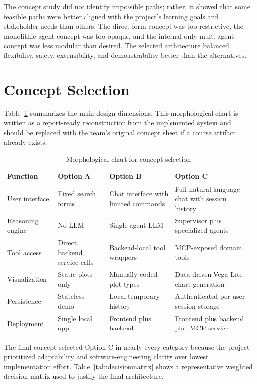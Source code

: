 \documentclass[12pt,oneside]{report}
\begin{document}
The concept study did not identify impossible paths; rather, it showed that some feasible paths were better aligned with the project's learning goals and stakeholder needs than others. The direct-form concept was too restrictive, the monolithic agent concept was too opaque, and the internal-only multi-agent concept was less modular than desired. The selected architecture balanced flexibility, safety, extensibility, and demonstrability better than the alternatives.

\section{Concept Selection}

Table~\ref{tab:morph} summarizes the main design dimensions. This morphological chart is written as a report-ready reconstruction from the implemented system and should be replaced with the team's original concept sheet if a course artifact already exists.

\begin{table}[H]
\centering
\caption{Morphological chart for concept selection}
\label{tab:morph}
\begin{tabularx}{\textwidth}{>{\raggedright\arraybackslash}p{1.55in} >{\raggedright\arraybackslash}X >{\raggedright\arraybackslash}X >{\raggedright\arraybackslash}X}
\toprule
\textbf{Function} & \textbf{Option A} & \textbf{Option B} & \textbf{Option C} \\
\midrule
User interface & Fixed search forms & Chat interface with limited commands & Full natural-language chat with session history \\
Reasoning engine & No LLM & Single-agent LLM & Supervisor plus specialized agents \\
Tool access & Direct backend service calls & Backend-local tool wrappers & MCP-exposed domain tools \\
Visualization & Static plots only & Manually coded plot types & Data-driven Vega-Lite chart generation \\
Persistence & Stateless demo & Local temporary history & Authenticated per-user session storage \\
Deployment & Single local app & Frontend plus backend & Frontend plus backend plus MCP service \\
\bottomrule
\end{tabularx}
\end{table}

The final concept selected Option C in nearly every category because the project prioritized adaptability and software-engineering clarity over lowest implementation effort. Table~\ref{tab:decisionmatrix} shows a representative weighted decision matrix used to justify the final architecture.
\end{document}
